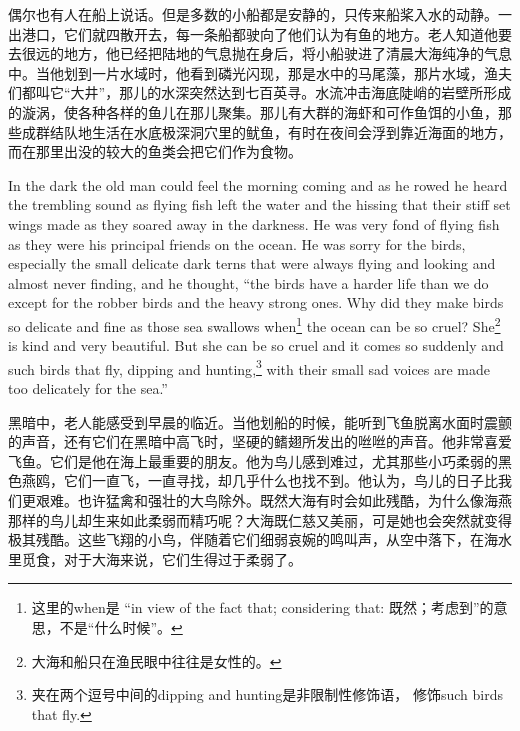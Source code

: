 \begin{paracol}{2}
\switchcolumn

偶尔也有人在船上说话。但是多数的小船都是安静的，只传来船桨入水的动静。一出港口，它们就四散开去，每一条船都驶向了他们认为有鱼的地方。老人知道他要去很远的地方，他已经把陆地的气息抛在身后，将小船驶进了清晨大海纯净的气息中。当他划到一片水域时，他看到磷光闪现，那是水中的马尾藻，那片水域，渔夫们都叫它“大井”，那儿的水深突然达到七百英寻。水流冲击海底陡峭的岩壁所形成的漩涡，使各种各样的鱼儿在那儿聚集。那儿有大群的海虾和可作鱼饵的小鱼，那些成群结队地生活在水底极深洞穴里的鱿鱼，有时在夜间会浮到靠近海面的地方，而在那里出没的较大的鱼类会把它们作为食物。

\switchcolumn*

In the dark the old man could feel the morning coming and as he rowed he
heard the \gls{trembling} sound as flying fish left the water and the
\gls{hissing} that their \gls{stiff} set \glspl{wing} made as they
\gls{soared} away in the darkness. He was very \gls{fond} of flying fish as
they were his \gls{principal} friends on the ocean. He was \gls{sorry} for
the birds, especially the small \gls{delicate} dark \glspl{tern} that were
always flying and looking and almost never finding, and he thought, ``the
birds have a harder life than we do except for the \gls{robber} birds and
the heavy strong ones. Why did they make birds so delicate and fine as those
sea \glspl{swallow} when\footnote{这里的when是 “in view of the fact that;
  considering that: 既然；考虑到”的意思，不是“什么时候”。} the ocean can
be so \gls{cruel}? She\footnote{大海和船只在渔民眼中往往是女性的。} is kind and very beautiful. But she can be so cruel
and it comes so suddenly and such birds that fly, dipping and
\gls{hunting},\footnote{夹在两个逗号中间的dipping and hunting是非限制性修饰语，
  修饰such birds that fly.} with their small sad voices are made too
\gls{delicately} for the sea.''

\switchcolumn

黑暗中，老人能感受到早晨的临近。当他划船的时候，能听到飞鱼脱离水面时震颤的声音，还有它们在黑暗中高飞时，坚硬的鳍翅所发出的咝咝的声音。他非常喜爱飞鱼。它们是他在海上最重要的朋友。他为鸟儿感到难过，尤其那些小巧柔弱的黑色燕鸥，它们一直飞，一直寻找，却几乎什么也找不到。他认为，鸟儿的日子比我们更艰难。也许猛禽和强壮的大鸟除外。既然大海有时会如此残酷，为什么像海燕那样的鸟儿却生来如此柔弱而精巧呢？大海既仁慈又美丽，可是她也会突然就变得极其残酷。这些飞翔的小鸟，伴随着它们细弱哀婉的鸣叫声，从空中落下，在海水里觅食，对于大海来说，它们生得过于柔弱了。

\switchcolumn*


\end{paracol}
